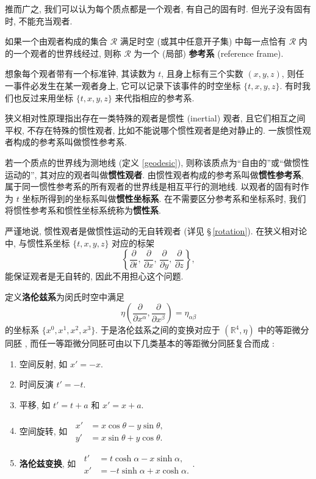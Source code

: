 推而广之, 我们可以认为每个质点都是一个观者, 有自己的固有时. 但光子没有固有时, 不能充当观者.

如果一个由观者构成的集合 $ \mathcal{R} $ 满足时空 (或其中任意开子集) 中每一点恰有 $ \mathcal{R} $ 内的一个观者的世界线经过, 则称 $ \mathcal{R} $ 为一个 (局部) {\bf 参考系} (reference frame). 

想象每个观者带有一个标准钟, 其读数为 $ t $, 且身上标有三个实数 $ (x,y,z) $, 则任一事件必发生在某一观者身上, 它可以记录下该事件的时空坐标 $ \{t,x,y,z\} $. 有时我们也反过来用坐标 $\{t,x,y,z\}$ 来代指相应的参考系.

狭义相对性原理指出存在一类特殊的观者是惯性 (inertial) 观者, 且它们相互之间平权, 不存在特殊的惯性观者, 比如不能说哪个惯性观者是绝对静止的. 一族惯性观者构成的参考系叫做惯性参考系.

若一个质点的世界线为测地线 (定义 \ref{geodesic}), 则称该质点为``自由的''或``做惯性运动的'', 其对应的观者叫做{\bf 惯性观者}. 由惯性观者构成的参考系叫做{\bf 惯性参考系}, 属于同一惯性参考系的所有观者的世界线是相互平行的测地线. 以观者的固有时作为 $ t $ 坐标所得到的坐标系叫做{\bf 惯性坐标系}. 在不需要区分参考系和坐标系时, 我们将惯性参考系和惯性坐标系统称为{\bf 惯性系}. 
\begin{remark}
    严谨地说, 惯性观者是做惯性运动的无自转观者 (详见 \S\,\ref{rotation}). 在狭义相对论中, 与惯性系坐标 $\{t,x,y,z\}$ 对应的标架
    \[ \left\{\frac{\partial}{\partial t},\,\frac{\partial}{\partial x},\,\frac{\partial}{\partial y},\,\frac{\partial}{\partial z}\right\}, \]
    能保证观者是无自转的, 因此不用担心这个问题.
\end{remark}
定义{\bf 洛伦兹系}为闵氏时空中满足
\[ \eta\left( \frac{\partial}{\partial x^\alpha},\frac{\partial}{\partial x^\beta} \right)=\eta_{\alpha\beta} \]
的坐标系 $ \{x^0,x^1,x^2,x^3\} $. 于是洛伦兹系之间的变换对应于 $ (\mathbb{R}^4,\eta) $ 中的等距微分同胚 \cite[定理 4-3-6]{梁灿彬2000微分几何入门与广义相对论}, 而任一等距微分同胚可由以下几类基本的等距微分同胚复合而成 \cite[上册 136 页]{梁灿彬2000微分几何入门与广义相对论}:
\begin{enumerate}
    \item 空间反射, 如 $ x'= -x $.
    \item 时间反演 $ t'=-t $.
    \item 平移, 如 $ t'=t+a $ 和 $ x'=x+a $.
    \item 空间旋转, 如 $\ \begin{aligned}
            x'&=x\cos\theta-y\sin\theta,\\
            y'&=x\sin\theta+y\cos\theta.
    \end{aligned}$
    \item {\bf 洛伦兹变换}, 如 $\ \begin{aligned}
        t'&=t\cosh\alpha-x\sinh\alpha,\\
        x'&=-t\sinh\alpha+x\cosh\alpha.
    \end{aligned}$.
\end{enumerate}

